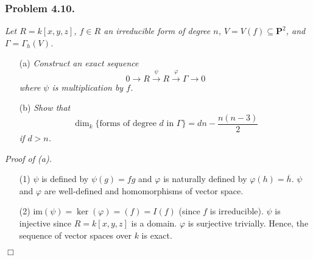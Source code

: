 \documentclass{article}
\begin{document}



\subsubsection*{Problem 4.10.}
\emph{Let $R = k[x,y,z]$, $f \in R$ an irreducible form of degree $n$,
$V = V(f) \subseteq \mathbf{P}^2$, and $\Gamma = \Gamma_h(V)$.}
\begin{enumerate}
\item[(a)]
  \emph{Construct an exact sequence
  \[
    0
    \to R
    \xrightarrow{\psi} R
    \xrightarrow{\varphi} \Gamma
    \to 0
  \]
  where $\psi$ is multiplication by $f$.}

\item[(b)]
  \emph{Show that
  \[
    \dim_k\{ \text{forms of degree $d$ in $\Gamma$} \} = dn - \frac{n(n-3)}{2}
  \]
  if $d > n$.} \\
\end{enumerate}



\emph{Proof of (a).}
\begin{enumerate}
\item[(1)]
  $\psi$ is defined by $\psi(g) = fg$ and
  $\varphi$ is naturally defined by $\varphi(h) = \overline{h}$.
  $\psi$ and $\varphi$ are well-defined and homomorphisms of vector space.

\item[(2)]
  $\mathrm{im}(\psi) = \ker(\varphi) = (f) = I(f)$
  (since $f$ is irreducible).
  $\psi$ is injective since $R = k[x,y,z]$ is a domain.
  $\varphi$ is surjective trivially.
  Hence, the sequence of vector spaces over $k$ is exact.
\end{enumerate}
$\Box$ \\
\end{document}
